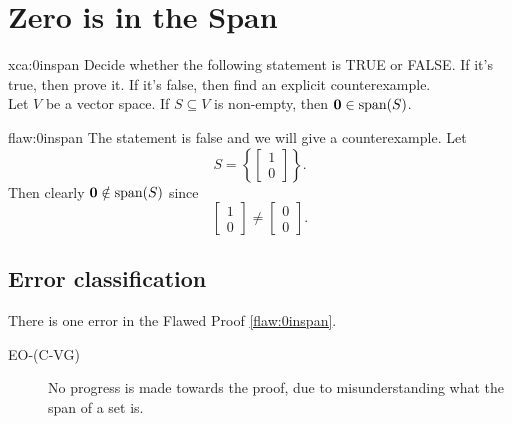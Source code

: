 \section{Zero is in the Span}

\begin{xca}{xca:0inspan}
Decide whether the following statement is TRUE or FALSE. If it's true, then prove it. If it's false, then  find an explicit counterexample. \\

Let $V$ be a vector space. If $S \subseteq V$ is non-empty, then ${\bf{0}} \in \text{span}(S)$.
\end{xca}

\begin{flaw}{flaw:0inspan} %
The statement is false and we will give a counterexample. Let
$$S = \left\{ \begin{bmatrix} 1 \\ 0 \end{bmatrix}\right\}.$$
Then clearly ${\bf{0}} \notin \text{span}(S)$ since
$$\begin{bmatrix} 1 \\ 0 \end{bmatrix} \neq \begin{bmatrix} 0 \\ 0 \end{bmatrix}. $$
\end{flaw}

\clearpage
\subsection{Error classification}


There is one error
 in the Flawed Proof \ref{flaw:0inspan}.

 \begin{description}
    \item[EO-(C-VG)] No progress is made towards the proof, due to misunderstanding what the span of a set is.

 	
 \end{description}


